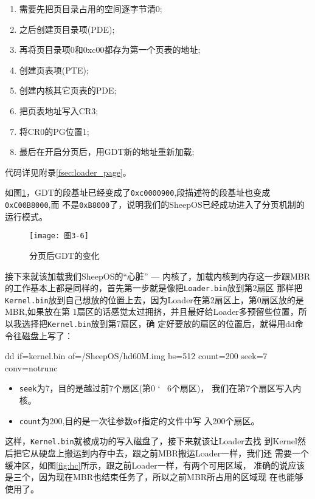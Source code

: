 \begin{enumerate}
\item 需要先把页目录占用的空间逐字节清0;
\item 之后创建页目录项(PDE);
\item 再将页目录项0和0xc00都存为第一个页表的地址;
\item 创建页表项(PTE);
\item 创建内核其它页表的PDE;
\item 把页表地址写入CR3;
\item 将CR0的PG位置1;
\item 最后在开启分页后，用GDT新的地址重新加载;
\end{enumerate}
代码详见附录\ref{fsec:loader_page}。

如图\ref{fig:infogdt}，GDT的段基址已经变成了\texttt{0xc0000900},段描述符的段基址也变成\texttt{0xC00B8000},而
不是\texttt{0xB8000}了，说明我们的SheepOS已经成功进入了分页机制的运行模式。
\begin{figure}[H]
  \centering
  \texttt{[image: 图3-6]}
  \caption{分页后GDT的变化}
  \label{fig:infogdt}
\end{figure}

接下来就该加载我们SheepOS的“心脏” --- 内核\cite{RL2011}了，加载内核到内存这一步跟MBR的工作基本上都是同样的，首先第一步就是像把\texttt{Loader.bin}放到第2扇区
那样把\texttt{Kernel.bin}放到自己想放的位置上去，因为Loader在第2扇区上，第0扇区放的是MBR,如果放在第
1扇区的话感觉太过拥挤，并且最好给Loader多预留些位置，所以我选择把\texttt{Kernel.bin}放到第7扇区，确
定好要放的扇区的位置后，就得用dd命令往磁盘上写了：

\begin{shellcode}
dd if=kernel.bin of=/SheepOS/hd60M.img bs=512 count=200 seek=7 conv=notrunc  
\end{shellcode}

\begin{itemize}
\item \texttt{seek}为7，目的是越过前7个扇区(第0 \char`~{} 6个扇区)，
  我们在第7个扇区写入内核。
\item \texttt{count}为200,目的是一次往参数\texttt{of}指定的文件中写
  入200个扇区。
\end{itemize}

这样，\texttt{Kernel.bin}就被成功的写入磁盘了，接下来就该让Loader去找
到Kernel然后把它从硬盘上搬运到内存中去，跟之前MBR搬运Loader一样，我们还
需要一个缓冲区，如图\ref{fig:hc}所示，跟之前Loader一样，有两个可用区域，
准确的说应该是三个，因为现在MBR也结束任务了，所以之前MBR所占用的区域现
在也能够使用了。

